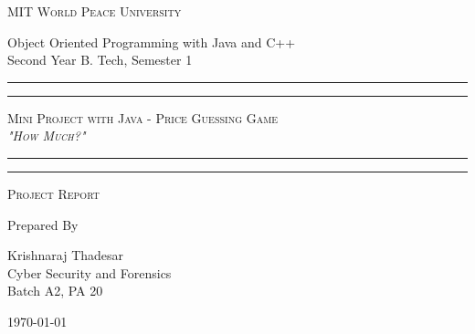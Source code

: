 \documentclass[11pt]{article}
\begin{document}
\begin{titlepage}
	\centering


	\huge\textsc{
		MIT World Peace University
	}\\

	\vspace{0.75\baselineskip} %

	\LARGE{
		Object Oriented Programming with Java and C++\\
		Second Year B. Tech, Semester 1
	}

	\vfill %


	\rule{\textwidth}{1.6pt}\vspace*{-\baselineskip}\vspace*{2pt}
	\rule{\textwidth}{0.6pt}
	\vspace{0.75\baselineskip} %



	\huge{\textsc{
			Mini Project with Java - Price Guessing Game\\
			\textit{"How Much?"}
		}} \\



	\vspace{0.5\baselineskip} %
	\rule{\textwidth}{0.6pt}\vspace*{-\baselineskip}\vspace*{2.8pt}
	\rule{\textwidth}{1.6pt}

	\vspace{1\baselineskip} %


	\LARGE\textsc{
		Project Report
	} %
	\vfill


	Prepared By
	\vspace{0.5\baselineskip} %

	\Large{
		Krishnaraj Thadesar \\
		Cyber Security and Forensics\\
		Batch A2, PA 20
	}


	\vspace{0.5\baselineskip} %
	\today

\end{titlepage}
\end{document}
